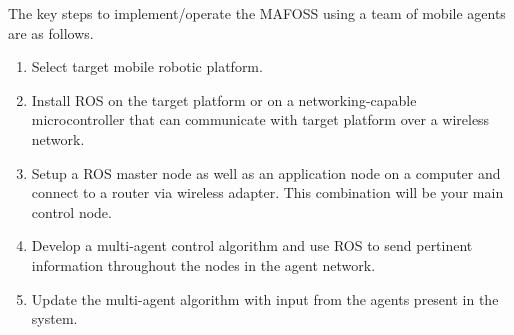 \begin{itemize}
    \end{itemize}

The key steps to implement/operate the MAFOSS using a team of mobile agents are as follows. %
\noindent
\begin{enumerate}
    \item Select target mobile robotic platform.
    \item Install ROS on the target platform or on a networking-capable microcontroller that can communicate with target platform over a wireless network.
    \item Setup a ROS master node as well as an  application node on a computer and connect to a router via wireless adapter. This combination will be your main control node. 
    \item Develop a multi-agent control algorithm and use ROS to send pertinent information throughout the nodes in the agent network.
    \item Update the multi-agent algorithm with input from the agents present in the system.

\end{enumerate}    

